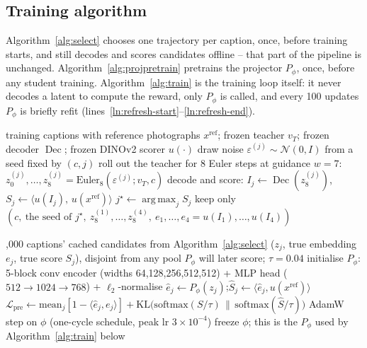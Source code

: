 \documentclass{article} %
\DeclareMathOperator*{\argmaxop}{arg\,max}
\DeclareMathOperator{\Dec}{Dec}
\begin{document}
\subsection{Training algorithm}
\label{sec:pseudocode}
Algorithm~\ref{alg:select} chooses one trajectory per caption, once, before training starts, and
still decodes and scores candidates offline -- that part of the pipeline is unchanged. Algorithm~\ref{alg:projpretrain}
pretrains the projector $P_\phi$, once, before any student training. Algorithm~\ref{alg:train} is
the training loop itself: it never decodes a latent to compute the reward, only $P_\phi$ is called,
and every 100 updates $P_\phi$ is briefly refit (lines~\ref{ln:refresh-start}--\ref{ln:refresh-end}).

\begin{algorithm}[t]
\caption{Choose a trajectory for every caption (once, before training)}
\label{alg:select}
\begin{algorithmic}[1]
\Require training captions with reference photographs $x^{\mathrm{ref}}$; frozen teacher $v_T$; frozen decoder $\Dec$; frozen DINOv2 scorer $u(\cdot)$
    \State draw noise $\varepsilon^{(j)}\sim\mathcal N(0,I)$ from a seed fixed by $(c,j)$
    \State roll out the teacher for 8 Euler steps at guidance $w{=}7$: $z^{(j)}_0,\dots,z^{(j)}_8=\mathrm{Euler}_8(\varepsilon^{(j)};v_T,c)$
    \State decode and score: $I_j\gets\Dec(z^{(j)}_8)$,\quad $S_j\gets\langle u(I_j),\,u(x^{\mathrm{ref}})\rangle$ 
  \EndFor
  \State $j^\star\gets\argmaxop_j S_j$ 
  \State keep only $(c,\ \text{the seed of } j^\star,\ z^{(1)}_8,\dots,z^{(4)}_8,\ e_1,\dots,e_4{=}u(I_1),\dots,u(I_4))$ 
\EndFor
\end{algorithmic}
\end{algorithm}

\begin{algorithm}[t]
\caption{Pretrain the projector $P_\phi$ (once, before any student training)}
\label{alg:projpretrain}
\begin{algorithmic}[1]
,000 captions' cached candidates from Algorithm~\ref{alg:select} ($z_j$, true embedding $e_j$, true score $S_j$), disjoint from any pool $P_\phi$ will later score; $\tau{=}0.04$
\State initialise $P_\phi$: 5-block conv encoder (widths 64,128,256,512,512) + MLP head ($512{\to}1024{\to}768$) + $\ell_2$-normalise
  \State $\hat e_j\gets P_\phi(z_j)$;\quad $\hat S_j\gets\langle\hat e_j,u(x^{\mathrm{ref}})\rangle$
  \State $\mathcal L_{\mathrm{pre}}\gets\mathrm{mean}_j[1-\langle\hat e_j,e_j\rangle]+\mathrm{KL}\big(\mathrm{softmax}(S/\tau)\,\|\,\mathrm{softmax}(\hat S/\tau)\big)$ 
  \State AdamW step on $\phi$ (one-cycle schedule, peak lr $3{\times}10^{-4}$)
\EndFor
\State freeze $\phi$; this is the $P_\phi$ used by Algorithm~\ref{alg:train} below
\end{algorithmic}
\end{algorithm}
\end{document}
